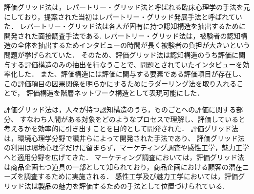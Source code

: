 \documentclass[syuuron]{kuee}
\begin{document}
		評価グリッド法は，レパートリー・グリッド法\cite{rg1}と呼ばれる臨床心理学の手法を元にしており，提案された当初はレパートリー・グリッド発展手法と呼ばれていた．
		レパートリー・グリッド法は各人が固有に持つ認知構造を抽出するために開発された面接調査手法である. 
		レパートリー・グリッド法は，被験者の認知構造の全体を抽出するためインタビューの時間が長く被験者の負担が大きいという問題が挙げられていた．
		そのため、評価グリッド法は認知構造のうち評価に関与する評価構造のみの抽出を行なうことで、問題とされていたインタビューを効率化した．
		また、評価構造には評価に関与する要素である評価項目が存在し、この評価項目の因果関係を明らかにするためにラダーリング法を取り入れることで，
		評価構造を階層ネットワーク構造として表現可能にした．
		
		評価グリッド法は，人々が持つ認知構造のうち，ものごとへの評価に関する部分、
		すなわち人間がある対象をどのようなプロセスで理解し、評価していると考えるかを効率的に引き出すことを目的として開発された．
		評価グリッド法は，環境心理学分野で讃井らによって開発された手法であり、
		評価グリッド法の利用は環境心理学だけに留まらず，マーケティング調査や感性工学，魅力工学へと適用分野を広げてきた．
		マーケティング調査においては，評価グリッド法は商品企画七つ道具の一部として知られており，商品企画における顧客の潜在ニーズを調査するために実施される．
		感性工学及び魅力工学においては，評価グリッド法は製品の魅力を評価するための手法として位置づけられている. 
		
\end{document}
